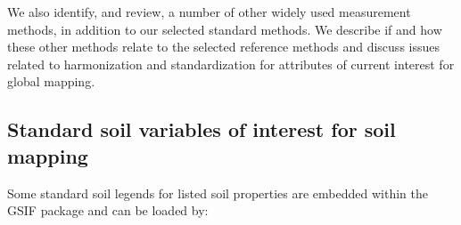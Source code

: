 \documentclass[11pt]{krantz}
\theoremstyle{definition}
\theoremstyle{definition}
\theoremstyle{definition}
\theoremstyle{remark}
\begin{document}
We also identify, and review, a number of other widely used measurement
methods, in addition to our selected standard methods. We describe if
and how these other methods relate to the selected reference methods and
discuss issues related to harmonization and standardization for
attributes of current interest for global mapping.

\hypertarget{standard-soil-variables-of-interest-for-soil-mapping}{%
\subsection{Standard soil variables of interest for soil
mapping}\label{standard-soil-variables-of-interest-for-soil-mapping}}

Some standard soil legends for listed soil properties are embedded
within the GSIF package and can be loaded by:
\end{document}

